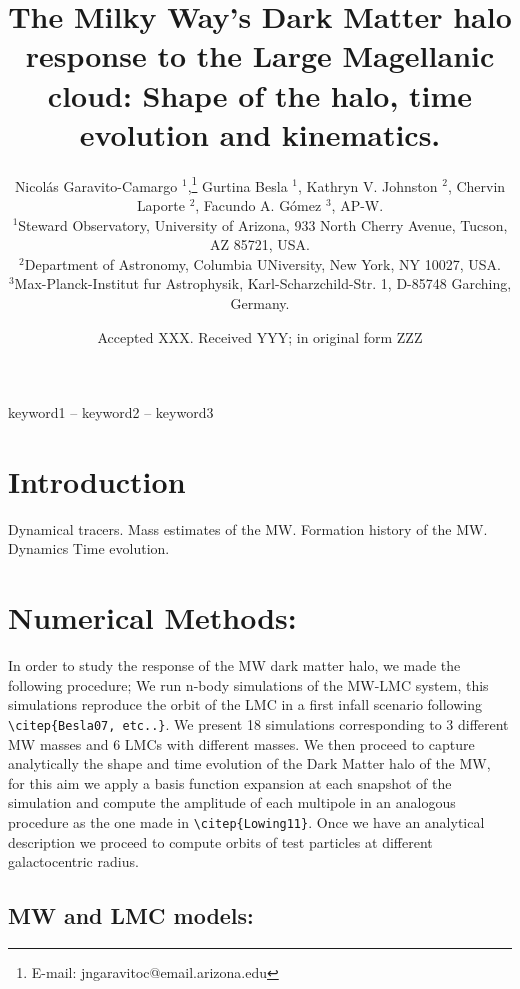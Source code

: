 \documentclass[a4paper,fleqn,usenatbib]{mnras}
\title[The Milky Way Dark Matter halo response to the Large Magellanic
Cloud]{The Milky Way's Dark Matter halo response to the Large Magellanic
cloud: Shape of the halo, time evolution and kinematics.}
\author[N. Garavito-Camargo et al.]{
Nicol\'as Garavito-Camargo $^{1}$,\thanks{E-mail:
jngaravitoc@email.arizona.edu}
Gurtina Besla $^{1}$,
Kathryn V. Johnston $^{2}$,
Chervin Laporte $^{2}$,
Facundo A. G\'omez $^{3}$,
AP-W.
\\
$^{1}$Steward Observatory, University of Arizona, 933 North Cherry
Avenue, Tucson, AZ 85721, USA.\\
$^{2}$Department of Astronomy, Columbia UNiversity, New York, NY
10027, USA.\\
$^{3}$Max-Planck-Institut fur Astrophysik, Karl-Scharzchild-Str. 1,
D-85748 Garching, Germany.
}
\date{Accepted XXX. Received YYY; in original form ZZZ}
\begin{document}
\label{firstpage}
\pagerange{\pageref{firstpage}--\pageref{lastpage}}
\maketitle

\begin{abstract}
\end{abstract}

\begin{keywords}
keyword1 -- keyword2 -- keyword3
\end{keywords}



\section{Introduction}

Dynamical tracers.
Mass estimates of the MW.
Formation history of the MW. Dynamics Time evolution. 

\cite{Bailin05}

\cite{Hernquist92}

\section{Numerical Methods:}

In order to study the response of the MW dark matter halo, we made the
following procedure; We run n-body simulations of the MW-LMC
system, this simulations reproduce the orbit of the LMC in a first
infall scenario following \verb+\citep{Besla07, etc..}+. We present 18
simulations corresponding to 3 different MW masses and 6 LMCs with
different masses. We then proceed to capture analytically the shape
and time evolution of the Dark Matter halo of the MW, for this aim we 
apply a basis function expansion at each snapshot of the simulation
and compute the amplitude of each multipole in an analogous
procedure as the one made in \verb+\citep{Lowing11}+. Once we have an
analytical description we proceed to compute orbits of test particles
at different galactocentric radius.


\subsection{MW and LMC models:}
\end{document}
